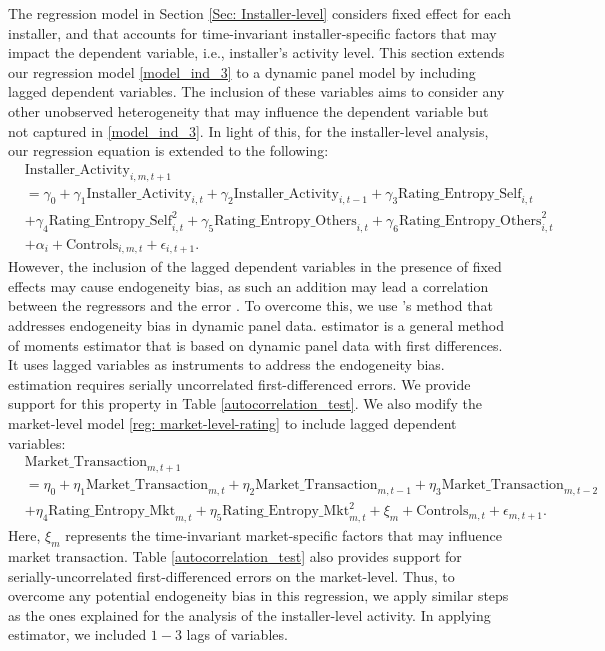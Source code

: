 \documentclass[msom,blindrev]{informs3}
\begin{document}
	The regression model in Section \ref{Sec: Installer-level} considers fixed effect for each installer, and that accounts for time-invariant installer-specific factors that may impact the dependent variable, i.e., installer's activity level. This section extends our regression model  \eqref{model_ind_3} to a dynamic panel model by including lagged dependent variables. The inclusion of these variables aims to consider any other unobserved heterogeneity that may influence the dependent variable but not captured in  \eqref{model_ind_3}. In light of this, for the installer-level analysis, our regression equation is extended to the following:
	\begin{align} \nonumber
	&\text{Installer\_Activity}_{i,m,t+1} \\ \nonumber
	&=\gamma_{0}+\gamma_{1} \text{Installer\_Activity}_{i,t}+ \gamma_{2}\text{Installer\_Activity}_{i,t-1}+
	\gamma_{3} \text{Rating\_Entropy\_Self}_{i,t} \\ \nonumber
	&+ \gamma_{4} \text{Rating\_Entropy\_Self}_{i,t}^ {2} + \gamma_{5} \text{Rating\_Entropy\_Others}_{i,t}  + \gamma_{6} \text{Rating\_Entropy\_Others}_{i,t}^{2} \\ \label{eq: extended_ind}
	&+ \alpha_{i}+ \text{Controls}_{i,m,t}+ \epsilon_{i,t+1}.
	\end{align}
However,  the inclusion of the lagged dependent variables in the presence of fixed effects may cause endogeneity bias, as such an addition may lead a correlation between the regressors and the error \citep{nickell1981biases}. To overcome this, we use \cite{arellano1991some}'s method that addresses endogeneity bias in dynamic panel data. \cite{arellano1991some} estimator is a general method of moments estimator that is based on dynamic panel data with first differences. It uses lagged variables as instruments to address the endogeneity bias. \cite{arellano1991some} estimation requires serially uncorrelated first-differenced errors. We provide support for this property in Table \ref{autocorrelation_test}. We also modify the market-level model \eqref{reg: market-level-rating} to include lagged dependent variables:
	\begin{align} \nonumber
	&\text{Market\_Transaction}_{m,t+1}\\ \nonumber
	& =\eta_{0}+ \eta_{1} \text{Market\_Transaction}_{m,t}+ \eta_{2} \text{Market\_Transaction}_{m,t-1} + \eta_{3} \text{Market\_Transaction}_{m,t-2} \\ \label{eq: ext_market_level}
	&+ \eta_{4} \text{Rating\_Entropy\_Mkt}_{m,t}+ \eta_{5}\text{Rating\_Entropy\_Mkt}_{m,t} ^2 + \xi_{m}+ \text{Controls}_{m,t}  +\epsilon_{m,t+1}.
	\end{align}
	Here, $\xi_{m}$ represents the time-invariant market-specific factors that may influence market transaction.  Table \ref{autocorrelation_test} also provides support for serially-uncorrelated first-differenced errors on the market-level. Thus, to overcome any potential endogeneity bias in this regression, we apply similar steps as the ones explained for the analysis of the installer-level activity. In applying  \cite{arellano1991some} estimator, we included $1-3$ lags of variables.
	
\end{document}
